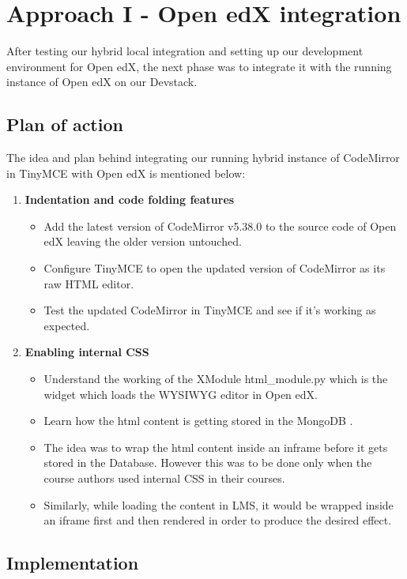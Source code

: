 \chapter{Approach I - Open edX integration}
After testing our hybrid local integration and setting up our development environment for Open edX,
the next phase was to integrate it with the running instance of Open edX on our Devstack.
\section{Plan of action}
The idea and plan behind integrating our running hybrid instance of CodeMirror in TinyMCE with
Open edX is mentioned below:
\begin{enumerate}
\item\textbf{Indentation and code folding features}
\begin{itemize}
\item Add the latest version of CodeMirror v5.38.0 to the source code of Open edX
leaving the older version untouched.
\item Configure TinyMCE to open the updated version of CodeMirror as its raw HTML
editor.
\item Test the updated CodeMirror in TinyMCE and see if it's working as expected.
\end{itemize}
\item\textbf{Enabling internal CSS}
\begin{itemize}
\item Understand the working of the XModule html\_module.py which is the widget
which loads the WYSIWYG editor in Open edX.
\item Learn how the html content is getting stored in the MongoDB .
\item The idea was to wrap the html content inside an inframe before it gets stored in the
Database. However this was to be done only when the course authors used internal
CSS in their courses.
\item Similarly, while loading the content in LMS, it would be wrapped inside an iframe
first and then rendered in order to produce the desired effect.
\end{itemize}
\end{enumerate}

\section{Implementation}
